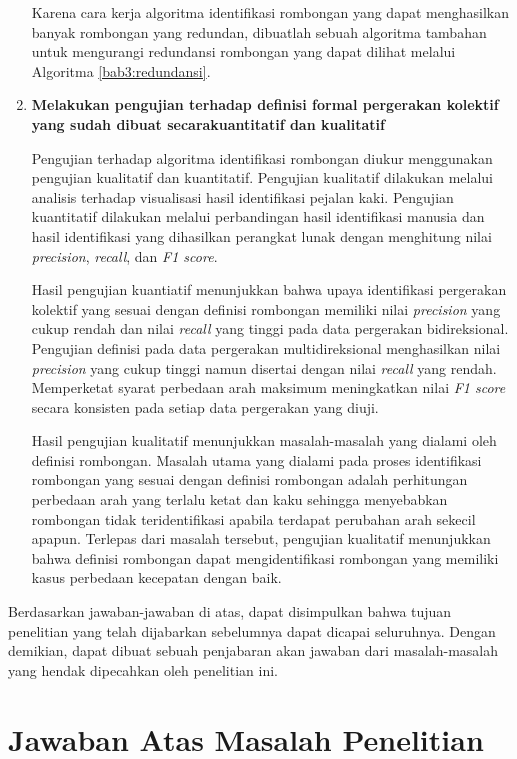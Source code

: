 \begin{enumerate}
    Karena cara kerja algoritma identifikasi rombongan yang dapat menghasilkan banyak rombongan yang redundan, dibuatlah sebuah algoritma tambahan untuk mengurangi redundansi rombongan yang dapat dilihat melalui Algoritma \ref{bab3:redundansi}.
    
    \item \textbf{Melakukan pengujian terhadap definisi formal pergerakan kolektif yang sudah dibuat secarakuantitatif dan kualitatif}
    
    Pengujian terhadap algoritma identifikasi rombongan diukur menggunakan pengujian kualitatif dan kuantitatif. Pengujian kualitatif dilakukan melalui analisis terhadap visualisasi hasil identifikasi pejalan kaki. Pengujian kuantitatif dilakukan melalui perbandingan hasil identifikasi manusia dan hasil identifikasi yang dihasilkan perangkat lunak dengan menghitung nilai \textit{precision}, \textit{recall}, dan \textit{F1 score}.
    
    Hasil pengujian kuantiatif menunjukkan bahwa upaya identifikasi pergerakan kolektif yang sesuai dengan definisi rombongan memiliki nilai \textit{precision} yang cukup rendah dan nilai \textit{recall} yang tinggi pada data pergerakan bidireksional. Pengujian definisi pada data pergerakan multidireksional menghasilkan nilai \textit{precision} yang cukup tinggi namun disertai dengan nilai \textit{recall} yang rendah. Memperketat syarat perbedaan arah maksimum meningkatkan nilai \textit{F1 score} secara konsisten pada setiap data pergerakan yang diuji.
    
    Hasil pengujian kualitatif menunjukkan masalah-masalah yang dialami oleh definisi rombongan. Masalah utama yang dialami pada proses identifikasi rombongan yang sesuai dengan definisi rombongan adalah perhitungan perbedaan arah yang terlalu ketat dan kaku sehingga menyebabkan rombongan tidak teridentifikasi apabila terdapat perubahan arah sekecil apapun. Terlepas dari masalah tersebut, pengujian kualitatif menunjukkan bahwa definisi rombongan dapat mengidentifikasi rombongan yang memiliki kasus perbedaan kecepatan dengan baik.
\end{enumerate}

Berdasarkan jawaban-jawaban di atas, dapat disimpulkan bahwa tujuan penelitian yang telah dijabarkan sebelumnya dapat dicapai seluruhnya. Dengan demikian, dapat dibuat sebuah penjabaran akan jawaban dari masalah-masalah yang hendak dipecahkan oleh penelitian ini.

\section{Jawaban Atas Masalah Penelitian}
\label{sec:jawaban-masalah}

